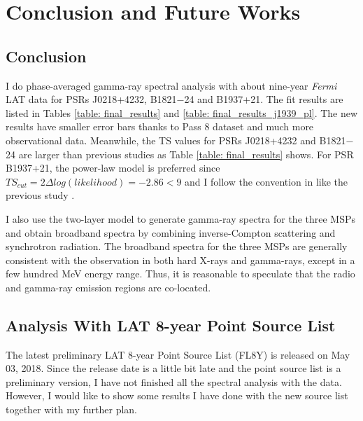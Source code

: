 \documentclass[a4paper, 12pt]{report}
\begin{document}
\chapter{Conclusion and Future Works}
  \section{Conclusion}
    I do phase-averaged gamma-ray spectral analysis with about nine-year \textit{Fermi} LAT
    data for PSRs J0218+4232, B1821$-$24 and B1937+21. The fit results are listed in Tables 
    \ref{table: final_results} and \ref{table: final_results_j1939_pl}. The new results 
    have smaller error bars thanks to Pass 8 dataset and much more observational data.
    Meanwhile, the TS values for PSRs J0218+4232 and B1821$-$24 are larger than previous 
    studies as Table \ref{table: final_results} shows. For PSR B1937+21, the power-law 
    model is preferred since $TS_{cut} = 2\Delta log(likelihood) = -2.86 < 9$ and I follow 
    the convention in \citet{0067-0049-208-2-17} like the previous study
    \citep{0004-637X-787-2-167}.

    I also use the two-layer model to generate gamma-ray spectra for the three MSPs and obtain 
    broadband spectra by combining inverse-Compton scattering and synchrotron radiation.
    The broadband spectra for the three MSPs are generally consistent with the observation 
    in both hard X-rays and gamma-rays, except in a few hundred MeV energy range. Thus, it 
    is reasonable to speculate that the radio and gamma-ray emission regions are co-located. 

  \section{Analysis With LAT 8-year Point Source List}
    The latest preliminary LAT 8-year Point Source List (FL8Y) is released 
    on May 03, 2018. Since the release date is a little bit late and the point source list 
    is a preliminary version, I have not finished all the spectral analysis with the data.
    However, I would like to show some results I have done with the new source list
    together with my further plan.
\end{document}
